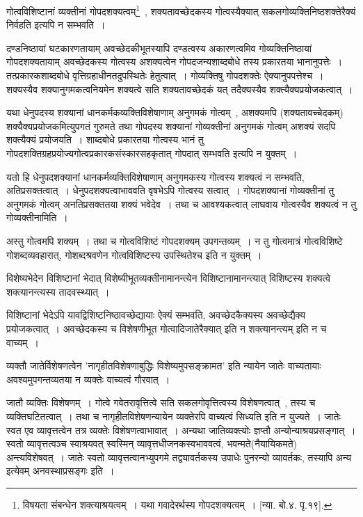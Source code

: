 			गोत्वविशिष्टानां व्यक्तीनां गोपदशक्यत्वम्\footnote{विषयता संबन्धेन शक्त्याश्रयत्वम्~। यथा गवादेरर्थस्य गोपदशक्यत्वम्~। [न्या. बो.४. पृ.१९].}~, शक्यतावच्छेदकस्य गोत्वस्यैक्यात् सकलगोव्यक्तिनिष्ठशक्तेरैक्यं निर्वहति इत्यपि न सम्भवति~। 

			दण्डनिष्ठायां घटकारणतायाम् अवच्छेदकीभूतस्यापि दण्डत्वस्य अकारणत्वमिव गोव्यक्तिनिष्ठायां गोपदशक्यतायाम् अवच्छेदकस्य गोत्वस्य अशक्यत्वेन गोपदजन्यशाब्दबोधे तस्य प्रकारतया भानानुपत्तेः~। तत्प्रकारकशाब्दबोधे वृत्तिग्रहाधीनतदुपस्थितेः हेतुत्वात्~। गोव्यक्तिषु गोपदशक्तेः  ऐक्यानुपपत्तेश्च~। शक्यस्यैव शक्यानुगमकत्वनियमेन शक्यत्वे सति शक्यतावच्छेदकं यत् तदैक्यस्यैव शक्त्यैक्यप्रयोजकत्वात्~। 

			यथा धेनुपदस्य शक्यानां धानकर्मकव्यक्तिविशेषाणाम् अनुगमकं  गोत्वम्~, अशक्यमपि (शक्यतावच्चेदकम्) शक्यैक्यप्रयोजकमित्युपगतं गुरुमते तथा गोपदस्य शक्यानां गोव्यक्तीनां अनुगमकं गोत्वम् अशक्यं सदपि शक्त्यैक्यं प्रयोजयति~। शाब्दबोधे प्रकारतया गोत्वस्य भानं तु गोपदशक्तिग्रहप्रयोज्यगोत्वप्रकारकसंस्कारसहकृतात् गोपदात् सम्भवति इत्यपि न युक्तम्~। 

			यतो हि धेनुपदशक्यानां धानकर्मव्यक्तिविशेषाणाम् अनुगमकस्य गोत्वस्य शक्यत्वं न सम्भवति, अतिप्रसक्तत्वात्~। धेनुपदशक्यत्वाभाववति वृषभेऽपि गोत्वस्य सत्वात्~। गोपदशक्यानां गोव्यक्तीनां तु अनुगमकं गोत्वम् अनतिप्रसक्ततया शक्यं भवेदेव~। तथा च आवश्यकत्वात् लाघवाय गोत्वस्यैव शक्यत्वं न तु गोव्यक्तीनामिति~।

			अस्तु गोत्वमपि शक्यम्~। तथा च गोत्वविशिष्टं गोपदशक्यम् उपगन्तव्यम्~। न तु गोत्वमात्रं गोत्वविशिष्टे गोशब्दव्यवहारात्, गोशब्दश्रवणेन गोत्वविशिष्टस्य उपस्थितेश्च इति न युक्तम्~।

			विशेष्यभेदेन विशिष्टानां भेदात् विशेष्यीभूतव्यक्तीनामानन्त्येन विशिष्टानामानन्त्यात् विशिष्टस्य शक्यत्वे शक्त्यानन्त्यस्य तादवस्थ्यात्~।

			विशिष्टानां भेदेऽपि यावद्विशिष्टनिष्ठावच्छेद्यायाः ऐक्यं सम्भवति, अवच्छेदकैक्यस्य अवच्छेद्यैक्य प्रयोजकत्वात्~। अवच्छेदकस्य च विशेषणीभूत गोत्वादिजातेरैक्यात् इति न शक्त्यानन्त्यम् इति न च वाच्यम्~।

			व्यक्तौ जातेर्विशेषणत्वेन 'नागृहीतविशेषणाबुद्धिः विशेष्यमुपसङ्क्रामत' इति न्यायेन जातेः वाच्यतायाः अवश्यमुपगन्तव्यतया न व्यक्तेः वाच्यत्वं गौरवात्~।

			जातौ व्यक्तिः विशेषणम्~। गोत्वे गवेतरावृत्तित्वे सति सकलगोवृत्तित्वस्य विशेषणत्वात्~, तस्य च व्यक्तिघटितत्वात्~। तथा च नागृहीतविशेषणन्यायेन व्यक्तेरपि वाच्यत्वं सिध्यति इति न युज्यते~। जातेः स्वत एव व्यावृत्तत्वेन तत्र व्यक्तेः विशेषणत्वाभावात्~। अन्यथा जातिव्यक्त्योः ज्ञप्तौ अन्योन्याश्रयप्रसङ्गात्~। स्वतो व्यावृत्तत्वञ्च स्वाश्रयवत् स्वस्मिन् व्यावृत्तधीजनकस्वभाववत्वं, भवन्मते(नैयायिकमते) अन्त्यविशेषवत्~। जातेः स्वतो व्यावृत्तत्वानभ्युपगमे तद्व्यावर्तकस्य उपाधेः पुनरन्यो व्यावर्तकः, तस्यापि अन्य इत्येवम् अनवस्थाप्रसङ्गः इति~।

